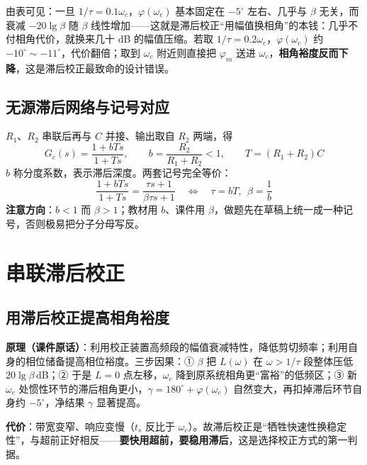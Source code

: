 \noindent 由表可见：一旦 $1/\tau=0.1\omega_c$，$\varphi(\omega_c)$ 基本固定在 $-5^\circ$ 左右、几乎与 $\beta$ 无关，而衰减 $-20\lg\beta$ 随 $\beta$ 线性增加——这就是滞后校正“用幅值换相角”的本钱：几乎不付相角代价，就换来几十 dB 的幅值压缩。若取 $1/\tau=0.2\omega_c$，$\varphi(\omega_c)$ 约 $-10^\circ\sim-11^\circ$，代价翻倍；取到 $\omega_c$ 附近则直接把 $\varphi_m$ 送进 $\omega_c$，\textbf{相角裕度反而下降}，这是滞后校正最致命的设计错误。

\subsection{无源滞后网络与记号对应}
$R_1$、$R_2$ 串联后再与 $C$ 并接、输出取自 $R_2$ 两端，得
\[
G_c(s)=\frac{1+bTs}{1+Ts},\qquad b=\frac{R_2}{R_1+R_2}<1,\qquad T=(R_1+R_2)C
\]
$b$ 称分度系数，表示滞后深度。两套记号完全等价：
\[
\frac{1+bTs}{1+Ts}=\frac{\tau s+1}{\beta\tau s+1}\quad\Longleftrightarrow\quad
\tau=bT,\ \ \beta=\frac1b
\]
\textbf{注意方向}：$b<1$ 而 $\beta>1$；教材用 $b$、课件用 $\beta$，做题先在草稿上统一成一种记号，否则极易把分子分母写反。

\bigskip

\section{串联滞后校正}

\subsection{用滞后校正提高相角裕度}
\textbf{原理（课件原话）}：利用校正装置高频段的幅值衰减特性，降低剪切频率；利用自身的相位储备提高相位裕度。三步因果：① $\beta$ 把 $L(\omega)$ 在 $\omega>1/\tau$ 段整体压低 $20\lg\beta$\,dB；② 于是 $L=0$ 点左移，$\omega_c$ 降到原系统相角更“富裕”的低频区；③ 新 $\omega_c$ 处惯性环节的滞后相角更小，$\gamma=180^\circ+\varphi(\omega_c)$ 自然变大，再扣掉滞后环节自身约 $-5^\circ$，净结果 $\gamma$ 显著提高。

\textbf{代价}：带宽变窄、响应变慢（$t_s$ 反比于 $\omega_c$）。故滞后校正是“牺牲快速性换稳定性”，与超前正好相反——\textbf{要快用超前，要稳用滞后}，这是选择校正方式的第一判据。

